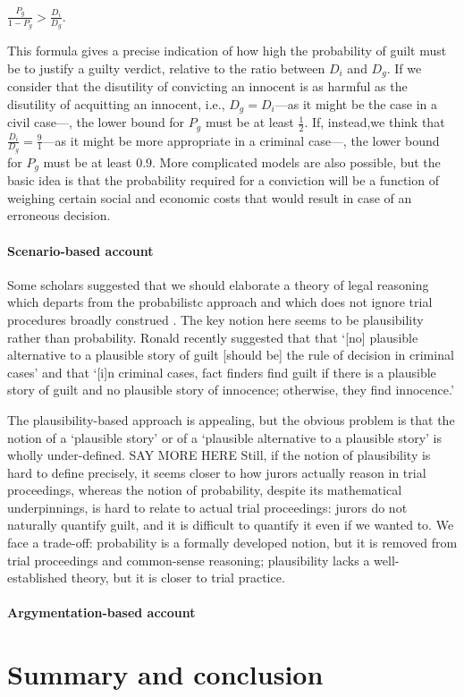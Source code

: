\documentclass[10pt]{article}
\begin{document}
\vspace{2mm}
$\frac{P_g}{1- P_g} > \frac{D_i}{D_g}$.

\vspace{2mm}
\noindent
This formula gives a precise indication of how high the probability 
of guilt must be to justify a guilty verdict, relative to the ratio between $D_i$ and $D_g$. If we consider that
the disutility of convicting an innocent is as harmful as the disutility of acquitting an innocent, 
i.e., $D_g=D_i$---as it might be the case in a civil case---, the lower bound for $P_g$ must be at least $\frac{1} {2}$. 
If, instead,we think that $\frac{D_i}{D_g}=\frac{9}{1}$---as it might be more appropriate in a criminal 
case---, the lower bound for $P_g$ must be at least $0.9$. More complicated models are also possible, 
but the basic idea is that the probability required for a 
conviction will be a function of weighing certain social and 
economic costs that would result in case of an erroneous decision. 



\paragraph{Scenario-based account}


Some scholars suggested that we should elaborate a 
theory of legal reasoning which departs from the 
probabilistc approach and which does not ignore trial procedures broadly construed
\citep{cohen77, nesson79, Thomson86, Walton2002, Stein05, Pardo2008Judicial-Proof-, ho08, Haack2011Legal-Probabili}.
The key notion here seems to be plausibility rather than probability.
Ronald \cite{Allen2010No-Plausible-Al} recently suggested that that 
`[no] plausible alternative to a plausible story of guilt [should be] the rule of decision in criminal cases'
and that `[i]n criminal cases, fact finders find guilt if there is a plausible story of guilt and 
no plausible story of innocence; otherwise, they find innocence.'

The plausibility-based approach is appealing, but the obvious problem is that the notion of a `plausible story' or of a `plausible alternative to a plausible story' is wholly under-defined. 
SAY MORE HERE
Still, if the notion of plausibility is hard to define precisely, it seems closer to how jurors actually reason in trial proceedings, whereas the notion of probability, despite its 
mathematical underpinnings, is hard to relate to actual trial proceedings: jurors do not naturally quantify guilt, and it is difficult to quantify it 
even if we wanted to. We face a trade-off: probability is a formally developed notion, but it is 
removed from trial proceedings and common-sense reasoning; plausibility 
lacks a well-established theory, but it is closer to trial practice. 


\paragraph{Argymentation-based account}


\section{Summary and conclusion}

%
	

\end{document}

